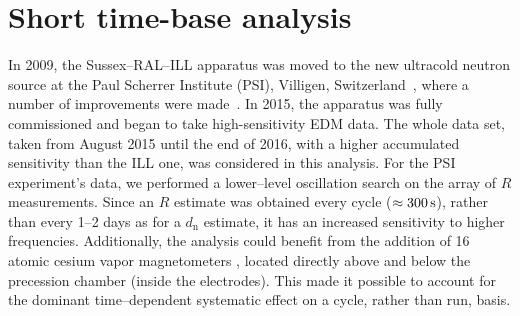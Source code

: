 
\section{Short time-base analysis}
In 2009, the Sussex--RAL--ILL apparatus was moved to the new ultracold neutron source at the Paul Scherrer Institute (PSI), Villigen, Switzerland~\cite{Anghel2009,Lauss2011,Lauss2012,Lauss2014}, where a number of improvements were made~\cite{Baker2011,Afach2015USSA,Ban2016NANOSC}. In 2015, the apparatus was fully commissioned and began to take high-sensitivity EDM data. The whole data set, taken from August 2015 until the end of 2016, with a higher accumulated sensitivity than the ILL one, was considered in this analysis. For the PSI experiment's data, we performed a lower--level oscillation search on the array of $R$ measurements. Since an $R$ estimate was obtained every cycle ($\unit[\approx 300]{s}$), rather than every 1--2 days as for a $d_\mathrm{n}$ estimate, it has an increased sensitivity to higher frequencies. Additionally, the analysis could benefit from the addition of 16 atomic cesium vapor magnetometers \cite{Knowles2009, Koch2015},
located directly above and below the precession chamber (inside the electrodes). This made it possible to account for the dominant time--dependent systematic effect on a cycle, rather than run, basis.

